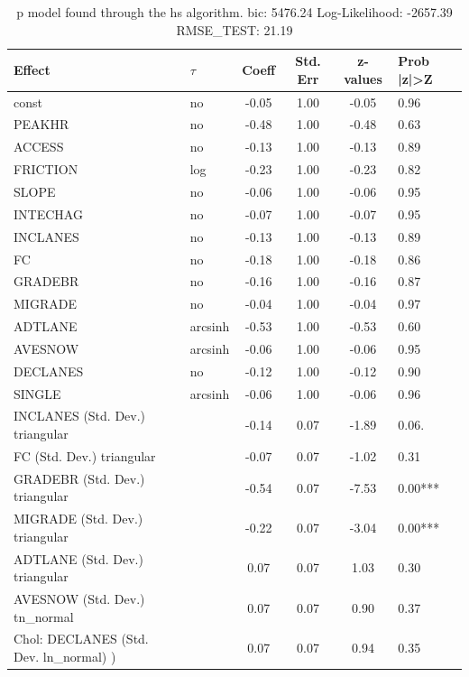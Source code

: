 \begin{table}
	\caption{p model found through the hs algorithm. bic: 5476.24 Log-Likelihood: -2657.39 RMSE_TEST: 21.19}
	\begin{center}
		\begin{tabular}{|l|l|c|c|c|l|}
			\hline
			Effect & $\tau$ & Coeff & Std. Err & z-values & Prob |z|>Z \\
			\hline
			const & no & -0.05 & 1.00 & -0.05 & 0.96 \\
			\hline
			PEAKHR & no & -0.48 & 1.00 & -0.48 & 0.63 \\
			\hline
			ACCESS & no & -0.13 & 1.00 & -0.13 & 0.89 \\
			\hline
			FRICTION & log & -0.23 & 1.00 & -0.23 & 0.82 \\
			\hline
			SLOPE & no & -0.06 & 1.00 & -0.06 & 0.95 \\
			\hline
			INTECHAG & no & -0.07 & 1.00 & -0.07 & 0.95 \\
			\hline
			INCLANES & no & -0.13 & 1.00 & -0.13 & 0.89 \\
			\hline
			FC & no & -0.18 & 1.00 & -0.18 & 0.86 \\
			\hline
			GRADEBR & no & -0.16 & 1.00 & -0.16 & 0.87 \\
			\hline
			MIGRADE & no & -0.04 & 1.00 & -0.04 & 0.97 \\
			\hline
			ADTLANE & arcsinh & -0.53 & 1.00 & -0.53 & 0.60 \\
			\hline
			AVESNOW & arcsinh & -0.06 & 1.00 & -0.06 & 0.95 \\
			\hline
			DECLANES & no & -0.12 & 1.00 & -0.12 & 0.90 \\
			\hline
			SINGLE & arcsinh & -0.06 & 1.00 & -0.06 & 0.96 \\
			\hline
			INCLANES (Std. Dev.) triangular &  & -0.14 & 0.07 & -1.89 & 0.06. \\
			\hline
			FC (Std. Dev.) triangular &  & -0.07 & 0.07 & -1.02 & 0.31 \\
			\hline
			GRADEBR (Std. Dev.) triangular &  & -0.54 & 0.07 & -7.53 & 0.00*** \\
			\hline
			MIGRADE (Std. Dev.) triangular &  & -0.22 & 0.07 & -3.04 & 0.00*** \\
			\hline
			ADTLANE (Std. Dev.) triangular &  & 0.07 & 0.07 & 1.03 & 0.30 \\
			\hline
			AVESNOW (Std. Dev.) tn_normal &  & 0.07 & 0.07 & 0.90 & 0.37 \\
			\hline
			 Chol: DECLANES (Std. Dev. ln_normal) ) &  & 0.07 & 0.07 & 0.94 & 0.35 \\

\end{tabular}
\end{center}
\end{table}
